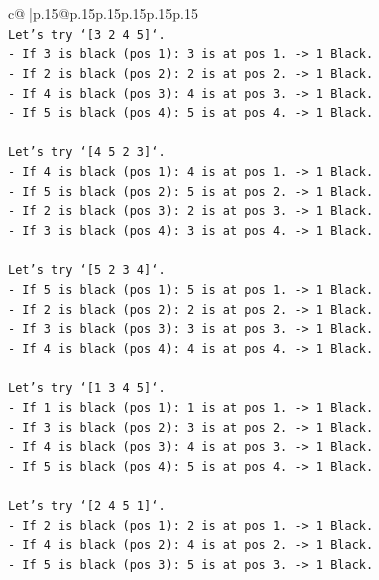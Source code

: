\documentclass{article}
\begin{document}
{\begin{supertabular}{c@{$\;$}|p{.15\linewidth}@{}p{.15\linewidth}p{.15\linewidth}p{.15\linewidth}p{.15\linewidth}p{.15\linewidth}}
{{{\\ 
\texttt{Let's try `{[}3 2 4 5{]}`.} \\
\texttt{{-} If 3 is black (pos 1): 3 is at pos 1. {-}> 1 Black.} \\
\texttt{{-} If 2 is black (pos 2): 2 is at pos 2. {-}> 1 Black.} \\
\texttt{{-} If 4 is black (pos 3): 4 is at pos 3. {-}> 1 Black.} \\
\texttt{{-} If 5 is black (pos 4): 5 is at pos 4. {-}> 1 Black.} \\
\\ 
\texttt{Let's try `{[}4 5 2 3{]}`.} \\
\texttt{{-} If 4 is black (pos 1): 4 is at pos 1. {-}> 1 Black.} \\
\texttt{{-} If 5 is black (pos 2): 5 is at pos 2. {-}> 1 Black.} \\
\texttt{{-} If 2 is black (pos 3): 2 is at pos 3. {-}> 1 Black.} \\
\texttt{{-} If 3 is black (pos 4): 3 is at pos 4. {-}> 1 Black.} \\
\\ 
\texttt{Let's try `{[}5 2 3 4{]}`.} \\
\texttt{{-} If 5 is black (pos 1): 5 is at pos 1. {-}> 1 Black.} \\
\texttt{{-} If 2 is black (pos 2): 2 is at pos 2. {-}> 1 Black.} \\
\texttt{{-} If 3 is black (pos 3): 3 is at pos 3. {-}> 1 Black.} \\
\texttt{{-} If 4 is black (pos 4): 4 is at pos 4. {-}> 1 Black.} \\
\\ 
\texttt{Let's try `{[}1 3 4 5{]}`.} \\
\texttt{{-} If 1 is black (pos 1): 1 is at pos 1. {-}> 1 Black.} \\
\texttt{{-} If 3 is black (pos 2): 3 is at pos 2. {-}> 1 Black.} \\
\texttt{{-} If 4 is black (pos 3): 4 is at pos 3. {-}> 1 Black.} \\
\texttt{{-} If 5 is black (pos 4): 5 is at pos 4. {-}> 1 Black.} \\
\\ 
\texttt{Let's try `{[}2 4 5 1{]}`.} \\
\texttt{{-} If 2 is black (pos 1): 2 is at pos 1. {-}> 1 Black.} \\
\texttt{{-} If 4 is black (pos 2): 4 is at pos 2. {-}> 1 Black.} \\
\texttt{{-} If 5 is black (pos 3): 5 is at pos 3. {-}> 1 Black.} \\
}}}
\end{supertabular}}
\end{document}
